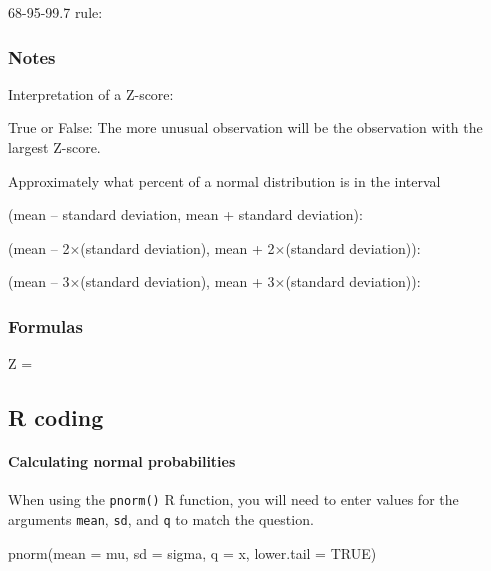 \documentclass[
]{report}
\newenvironment{Shaded}{\begin{snugshade}}{\end{snugshade}}
\newcommand{\AttributeTok}[1]{\textcolor[rgb]{0.77,0.63,0.00}{#1}}
\newcommand{\ConstantTok}[1]{\textcolor[rgb]{0.00,0.00,0.00}{#1}}
\newcommand{\FunctionTok}[1]{\textcolor[rgb]{0.00,0.00,0.00}{#1}}
\newcommand{\NormalTok}[1]{#1}
\newcommand{\rgs}{\vspace{12pt}} %
\newcommand{\rgi}{\hspace{24pt}}  %
\begin{document}
68-95-99.7 rule:
\rgs

\hypertarget{notes-16}{%
\subsubsection*{Notes}\label{notes-16}}

Interpretation of a Z-score:
\rgs

True or False: The more unusual observation will be the observation with the largest Z-score.

Approximately what percent of a normal distribution is in the interval

\rgi (mean -- standard deviation, mean + standard deviation):
\rgs

\rgi (mean -- 2\(\times\)(standard deviation), mean + 2\(\times\)(standard deviation)):
\rgs

\rgi (mean -- 3\(\times\)(standard deviation), mean + 3\(\times\)(standard deviation)):
\rgs

\hypertarget{formulas-1}{%
\subsubsection*{Formulas}\label{formulas-1}}

Z =
\rgs

\hypertarget{r-coding}{%
\subsection*{R coding}\label{r-coding}}

\hypertarget{calculating-normal-probabilities}{%
\paragraph*{Calculating normal probabilities}\label{calculating-normal-probabilities}}

When using the \texttt{pnorm()} R function, you will need to enter values for the arguments \texttt{mean}, \texttt{sd}, and \texttt{q} to match the question.

\begin{Shaded}
\begin{Highlighting}[]
\FunctionTok{pnorm}\NormalTok{(}\AttributeTok{mean =}\NormalTok{ mu, }\AttributeTok{sd =}\NormalTok{ sigma, }\AttributeTok{q =}\NormalTok{ x, }\AttributeTok{lower.tail =} \ConstantTok{TRUE}\NormalTok{)}
\end{Highlighting}
\end{Shaded}
\end{document}
